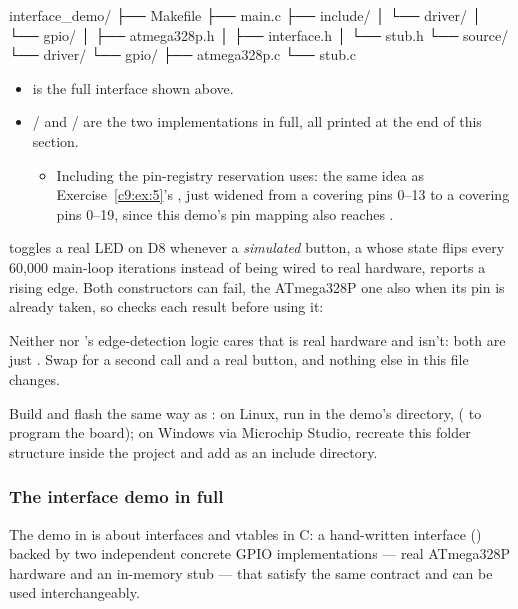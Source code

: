 \begin{console}
interface_demo/
├── Makefile
├── main.c
├── include/
│   └── driver/
│       └── gpio/
│           ├── atmega328p.h
│           ├── interface.h
│           └── stub.h
└── source/
    └── driver/
        └── gpio/
            ├── atmega328p.c
            └── stub.c
\end{console}

\begin{itemize}
  \item {} is the full interface shown above.
  \item {}/ and / are the
    two implementations in full, all printed at the end of this section.
  \begin{itemize}
    \item Including the pin-registry reservation  uses: the same idea
      as Exercise~\ref{c9:ex:5}'s , just widened from a  covering pins
      0--13 to a  covering pins 0--19, since this demo's pin mapping also reaches
      .
  \end{itemize}
\end{itemize}
 toggles a real LED on D8 whenever a \emph{simulated} button, a 
whose state flips every 60,000 main-loop iterations instead of being wired to real hardware,
reports a rising edge. Both constructors can fail, the ATmega328P one also when its pin is already
taken, so  checks each result before using it:


\noindent Neither  nor 's edge-detection logic cares that
 is real hardware and  isn't: both are just . Swap
 for a second  call and a real button, and
nothing else in this file changes.

Build and flash the same way as : on Linux, run  in the demo's
directory,  ( to program the board); on Windows
via Microchip Studio, recreate this folder structure inside the project and add  as
an include directory.

\subsubsection{The interface demo in full}
The demo in  is about interfaces and vtables in C: a hand-written
interface () backed by two independent concrete GPIO implementations ---
real ATmega328P hardware and an in-memory stub --- that satisfy the same contract and can be used
interchangeably.

